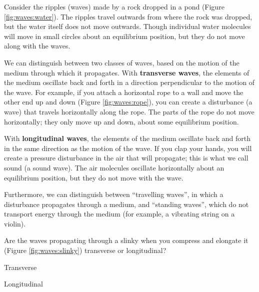 Consider the ripples (waves) made by a rock dropped in a pond (Figure \ref{fig:waves:water}). The ripples travel outwards from where the rock was dropped, but the water itself does not move outwards. Though individual water molecules will move in small circles about an equilibrium position, but they do not move along with the waves.

We can distinguish between two classes of waves, based on the motion of the medium through which it propagates. With \textbf{transverse waves}, the elements of the medium oscillate back and forth in a direction perpendicular to the motion of the wave. For example, if you attach a horizontal rope to a wall and move the other end up and down (Figure \ref{fig:waves:rope}), you can create a disturbance (a wave) that travels horizontally along the rope. The parts of the rope do not move horizontally; they only move up and down, about some equilibrium position. 

With \textbf{longitudinal waves}, the elements of the medium oscillate back and forth in the same direction as the motion of the wave. If you clap your hands, you will create a pressure disturbance in the air that will propagate; this is what we call sound (a sound wave). The air molecules oscillate horizontally about an equilibrium position, but they do not move with the wave.

 Furthermore, we can distinguish between ``travelling waves'', in which a disturbance propagates through a medium, and ``standing waves'', which do not transport energy through the medium (for example, a vibrating string on a violin). 

\begin{checkpoint}
\begin{MCquestion}{Are the waves propagating through a slinky when you compress and elongate it (Figure \ref{fig:waves:slinky}) transverse or longitudinal?
}
\item Transverse
\item Longitudinal
\end{MCquestion}
\end{checkpoint}




